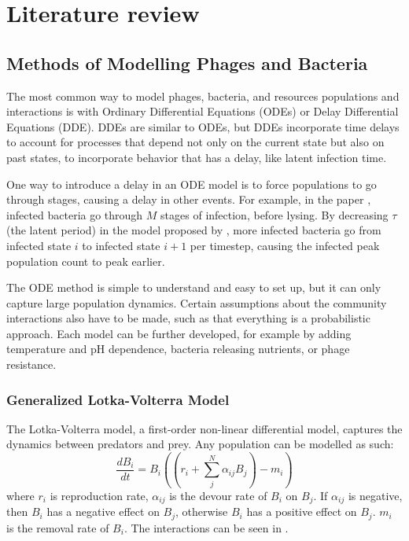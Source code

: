 \chapter{Literature review}
\label{LR}

\section{Methods of Modelling Phages and Bacteria}
The most common way to model phages, bacteria, and resources populations and interactions is with Ordinary Differential Equations (ODEs) or Delay Differential Equations (DDE). 
DDEs are similar to ODEs, but DDEs incorporate time delays to account for processes that depend not only on the current state but also on past states, to incorporate behavior that has a delay, like latent infection time. 

One way to introduce a delay in an ODE model is to force populations to go through stages, causing a delay in other events. 
For example, in the paper \citet{gengUsingBacterialPopulation2024}, infected bacteria go through $M$ stages of infection, before lysing. 
By decreasing $\tau$ (the latent period) in the model proposed by \citet{gengUsingBacterialPopulation2024}, more infected bacteria go from infected state $i$ to infected state $i+1$ per timestep, causing the infected peak population count to peak earlier. 

The ODE method is simple to understand and easy to set up, but it can only capture large population dynamics.
Certain assumptions about the community interactions also have to be made, such as that everything is a probabilistic approach. 
Each model can be further developed, for example by adding temperature and pH dependence, bacteria releasing nutrients, or phage resistance. 

\subsection{Generalized Lotka-Volterra Model}
The Lotka-Volterra model, a first-order non-linear differential model, captures the dynamics between predators and prey.
Any population can be modelled as such:
\[ 
    \frac{d{B}_i}{dt} = {B}_i \left(\left(r_i + \sum_{j}^{N} \alpha_{ij}{B}_j \right) - m_i\right)
\]
where $r_i$ is reproduction rate, $\alpha_{ij}$ is the devour rate of $B_i$ on $B_j$. If $\alpha_{ij}$ is negative, then $B_i$ has a negative effect on $B_j$, otherwise $B_i$ has a positive effect on $B_j$. $m_i$ is the removal rate of $B_i$. 
The interactions can be seen in . 

